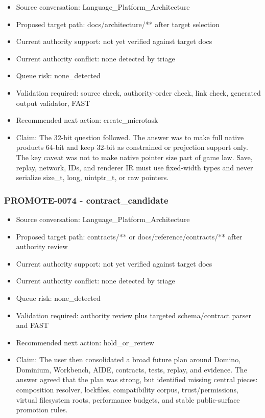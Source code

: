 \documentclass[11pt,a4paper]{report}
\begin{document}
\begin{itemize}
\item Source conversation: Language\_Platform\_Architecture
\item Proposed target path: docs/architecture/** after target selection
\item Current authority support: not yet verified against target docs
\item Current authority conflict: none detected by triage
\item Queue risk: none\_detected
\item Validation required: source check, authority-order check, link check, generated output validator, FAST
\item Recommended next action: create\_microtask
\item Claim: The 32-bit question followed. The answer was to make full native products 64-bit and keep 32-bit as constrained or projection support only. The key caveat was not to make native pointer size part of game law. Save, replay, network, IDs, and renderer IR must use fixed-width types and never serialize size\_t, long, uintptr\_t, or raw pointers.
\end{itemize}

\subsubsection{PROMOTE-0074 - contract\_candidate}

\begin{itemize}
\item Source conversation: Language\_Platform\_Architecture
\item Proposed target path: contracts/** or docs/reference/contracts/** after authority review
\item Current authority support: not yet verified against target docs
\item Current authority conflict: none detected by triage
\item Queue risk: none\_detected
\item Validation required: authority review plus targeted schema/contract parser and FAST
\item Recommended next action: hold\_or\_review
\item Claim: The user then consolidated a broad future plan around Domino, Dominium, Workbench, AIDE, contracts, tests, replay, and evidence. The answer agreed that the plan was strong, but identified missing central pieces: composition resolver, lockfiles, compatibility corpus, trust/permissions, virtual filesystem roots, performance budgets, and stable public-surface promotion rules.
\end{itemize}
\end{document}
